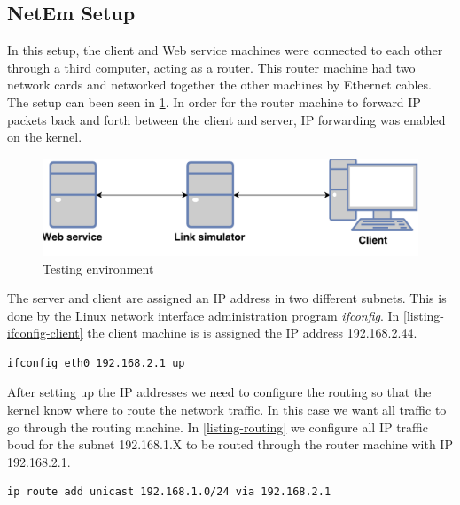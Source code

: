 \subsection{NetEm Setup}

In this setup, the client and Web service machines were connected to each other
through a third computer, acting as a router. This router machine had two
network cards and networked together the other machines by Ethernet cables. The
setup can been seen in \cref{figure-testing-environment}. In order for the
router machine to forward IP packets back and forth between the client and
server, IP forwarding was enabled on the kernel.

\begin{figure}[h]
\includegraphics[scale=0.6]{images/testing_environment.pdf}
\caption{Testing environment}
\label{figure-testing-environment}
\end{figure}

The server and client are assigned an IP address in two different subnets.
This is done by the Linux network interface administration program
\textit{ifconfig}. In \cref{listing-ifconfig-client} the client machine is is
assigned the IP address 192.168.2.44.

\begin{lstlisting}[frame=single, caption="Configuring a network interface of the router", label=listing-ifconfig-client]
ifconfig eth0 192.168.2.1 up
\end{lstlisting}

After setting up the IP addresses we need to configure the routing so that the
kernel know where to route the network traffic. In this case we want all
traffic to go through the routing machine. In \cref{listing-routing} we
configure all IP traffic boud for the subnet 192.168.1.X to be routed through
the router machine with IP 192.168.2.1.

\begin{lstlisting}[frame=single, caption="Configuring routing rules for the client", label=listing-routing]
ip route add unicast 192.168.1.0/24 via 192.168.2.1
\end{lstlisting}

